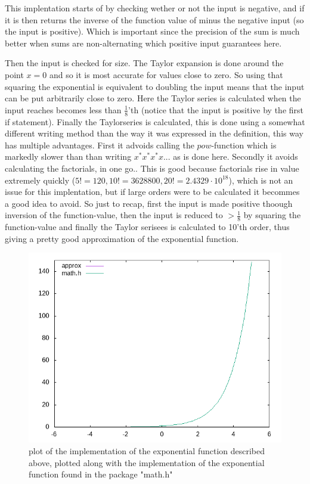 \documentclass{article}
\begin{document}
    This implentation starts of by checking wether or not the input is negative,
 and if it is then returns the inverse of the function value of minus the negative input (so the input is positive). 
Which is important since the precision of the sum is much better when sums are non-alternating which positive input guarantees here.

    Then the input is checked for size. The Taylor expansion is done around the point $x=0$ and so it is most accurate for values close to zero. 
So using that squaring the exponential is equivalent to doubling the input means that the input can be put arbitrarily close to zero. 
Here the Taylor series is calculated when the input reaches becomes less than $\frac{1}{8}$'th 
(notice that the input is positive by the first if statement). Finally the Taylorseries is calculated, 
this is done using a somewhat different writing method than the way it was expressed in the definition,
 this way has multiple advantages. First it advoids calling the $pow$-function which is markedly slower
 than than writing $x^*x^*x^*x...$ as is done here. Secondly it avoids calculating the factorials, in one go..
 This is good because factorials rise in value extremely quickly ($5!=120,  10!=3628800, 20!=2.4329\cdot 10^{18}$),
 which is not an issue for this implentation, but if large orders were to be calculated it becommes a good idea to avoid.
 So just to recap, first the input is made positive thoough inversion of the function-value, then the input is reduced to
 $>\frac{1}{8}$ by squaring the function-value and finally the Taylor serisees is calculated to 10'th order,
 thus giving a pretty good approximation of the exponential function.                           

                                                          \begin{figure}[h]

                                                          \centering

                                                          \includegraphics[width=0.65\linewidth]{exp.png}

                                                          \caption{plot of the implementation of the exponential function described above, plotted along with the implementation of the exponential function found in the package "math.h"}\label{fig:exp}

                             \end{figure}

 

                            
\end{document}
